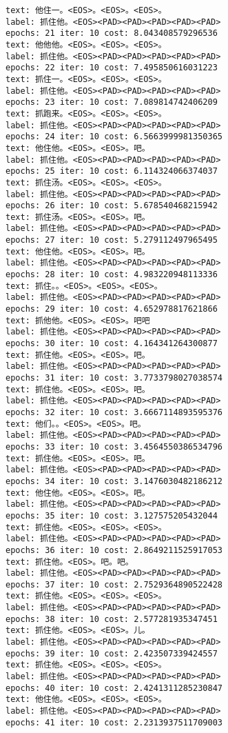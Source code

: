 \documentclass[11pt]{article}
\begin{document}
\begin{Verbatim}[commandchars=\\\{\}]
text: 他住一。<EOS>。<EOS>。<EOS>。
label: 抓住他。<EOS><PAD><PAD><PAD><PAD><PAD>
epochs: 21 iter: 10 cost: 8.043408579296536
text: 他他他。<EOS>。<EOS>。<EOS>。
label: 抓住他。<EOS><PAD><PAD><PAD><PAD><PAD>
epochs: 22 iter: 10 cost: 7.495850616031223
text: 抓住一。<EOS>。<EOS>。<EOS>。
label: 抓住他。<EOS><PAD><PAD><PAD><PAD><PAD>
epochs: 23 iter: 10 cost: 7.089814742406209
text: 抓跑来。<EOS>。<EOS>。<EOS>。
label: 抓住他。<EOS><PAD><PAD><PAD><PAD><PAD>
epochs: 24 iter: 10 cost: 6.5663999981350365
text: 他住他。<EOS>。<EOS>。吧。
label: 抓住他。<EOS><PAD><PAD><PAD><PAD><PAD>
epochs: 25 iter: 10 cost: 6.114324066374037
text: 抓住汤。<EOS>。<EOS>。<EOS>。
label: 抓住他。<EOS><PAD><PAD><PAD><PAD><PAD>
epochs: 26 iter: 10 cost: 5.678540468215942
text: 抓住汤。<EOS>。<EOS>。吧。
label: 抓住他。<EOS><PAD><PAD><PAD><PAD><PAD>
epochs: 27 iter: 10 cost: 5.279112497965495
text: 他住他。<EOS>。<EOS>。吧。
label: 抓住他。<EOS><PAD><PAD><PAD><PAD><PAD>
epochs: 28 iter: 10 cost: 4.983220948113336
text: 抓住。。<EOS>。<EOS>。<EOS>。
label: 抓住他。<EOS><PAD><PAD><PAD><PAD><PAD>
epochs: 29 iter: 10 cost: 4.652978817621866
text: 抓他他。<EOS>。<EOS>。吧吧
label: 抓住他。<EOS><PAD><PAD><PAD><PAD><PAD>
epochs: 30 iter: 10 cost: 4.164341264300877
text: 抓住他。<EOS>。<EOS>。吧。
label: 抓住他。<EOS><PAD><PAD><PAD><PAD><PAD>
epochs: 31 iter: 10 cost: 3.7733798027038574
text: 抓住他。<EOS>。<EOS>。吧。
label: 抓住他。<EOS><PAD><PAD><PAD><PAD><PAD>
epochs: 32 iter: 10 cost: 3.6667114893595376
text: 他们。。<EOS>。<EOS>。吧。
label: 抓住他。<EOS><PAD><PAD><PAD><PAD><PAD>
epochs: 33 iter: 10 cost: 3.4564550386534796
text: 抓住他。<EOS>。<EOS>。吧。
label: 抓住他。<EOS><PAD><PAD><PAD><PAD><PAD>
epochs: 34 iter: 10 cost: 3.1476030482186212
text: 他住他。<EOS>。<EOS>。吧。
label: 抓住他。<EOS><PAD><PAD><PAD><PAD><PAD>
epochs: 35 iter: 10 cost: 3.127575205432044
text: 抓住他。<EOS>。<EOS>。<EOS>。
label: 抓住他。<EOS><PAD><PAD><PAD><PAD><PAD>
epochs: 36 iter: 10 cost: 2.8649211525917053
text: 抓住他。<EOS>。吧。吧。
label: 抓住他。<EOS><PAD><PAD><PAD><PAD><PAD>
epochs: 37 iter: 10 cost: 2.7529364890522428
text: 抓住他。<EOS>。<EOS>。<EOS>。
label: 抓住他。<EOS><PAD><PAD><PAD><PAD><PAD>
epochs: 38 iter: 10 cost: 2.577281935347451
text: 抓住他。<EOS>。<EOS>。儿。
label: 抓住他。<EOS><PAD><PAD><PAD><PAD><PAD>
epochs: 39 iter: 10 cost: 2.423507339424557
text: 抓住他。<EOS>。<EOS>。<EOS>。
label: 抓住他。<EOS><PAD><PAD><PAD><PAD><PAD>
epochs: 40 iter: 10 cost: 2.4241311285230847
text: 他住他。<EOS>。<EOS>。<EOS>。
label: 抓住他。<EOS><PAD><PAD><PAD><PAD><PAD>
epochs: 41 iter: 10 cost: 2.2313937511709003

\end{Verbatim}
\end{document}
